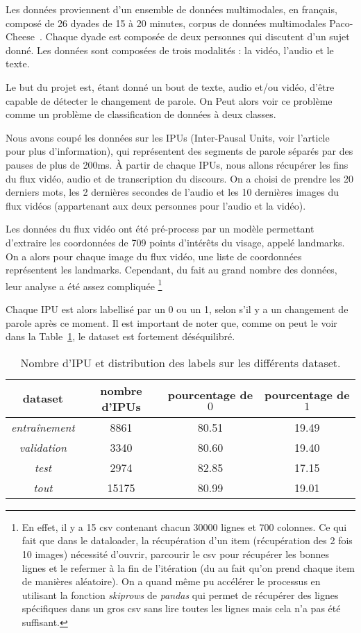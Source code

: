 Les données proviennent d'un ensemble de données multimodales, en français, composé de 26 dyades de 15 à 20 minutes, 
corpus de données multimodales Paco-Cheese~\cite{paperswithcode-paco}.
Chaque dyade est composée de deux personnes qui discutent d'un sujet donné. Les données sont composées de trois modalités : la vidéo,
l'audio et le texte.

Le but du projet est, étant donné un bout de texte, audio et/ou vidéo, d'être capable de détecter le changement de parole.
On Peut alors voir ce problème comme un problème de classification de données à deux classes.

Nous avons coupé les données sur les IPUs (Inter-Pausal Units, voir l'article~\cite{turn-taking} pour plus d'information),
qui représentent des segments de parole séparés par des pauses
de plus de 200ms. À partir de chaque IPUs, nous allons récupérer les fins du flux vidéo, audio et de transcription du discours.
On a choisi de prendre les 20 derniers mots, les 2 dernières secondes de l'audio et les 10 dernières images du flux vidéos
(appartenant aux deux personnes pour l'audio et la vidéo).

Les données du flux vidéo ont été pré-process par un modèle permettant d'extraire les coordonnées de 709 points d'intérêts du 
visage, appelé landmarks. On a alors pour chaque image du flux vidéo, une liste de coordonnées représentent les landmarks. Cependant, 
du fait au grand nombre des données, leur analyse a été assez compliquée
\footnote{En effet, il y a 15 csv contenant chacun 30000 lignes et 700 colonnes. Ce qui fait que dans le dataloader, 
la récupération d'un item (récupération des 2 fois 10 images) nécessité d'ouvrir, parcourir le csv pour récupérer les bonnes lignes et
le refermer à la fin de l'itération (du au fait qu'on prend chaque item de manières aléatoire). On a quand même pu accélérer le processus
en utilisant la fonction \textit{skiprows} de \textit{pandas} qui permet de récupérer des lignes spécifiques dans un gros csv sans lire 
toutes les lignes mais cela n'a pas été suffisant.}

Chaque IPU est alors labellisé par un 0 ou un 1, selon s'il y a un changement de parole après ce moment. Il est important de noter que, 
comme on peut le voir dans la Table~\ref{tab: label distribution}, le dataset est fortement déséquilibré.

\begin{table}[H]
    \centering
    \begin{tabular}{|c|c|c|c|}
        \hline
        dataset & nombre d'IPUs & pourcentage de $0$ & pourcentage de $1$ \\
        \hline
        \textit{entraînement} & 8861 & 80.51 & 19.49\\
        \hline
        \textit{validation} & 3340 & 80.60 & 19.40\\
        \hline
        \textit{test} & 2974 & 82.85 & 17.15\\
        \hline
        \textit{tout} & 15175 & 80.99 & 19.01 \\
        \hline
    \end{tabular}
    \caption{Nombre d'IPU et distribution des labels sur les différents dataset.}
    \label{tab: label distribution}
\end{table}